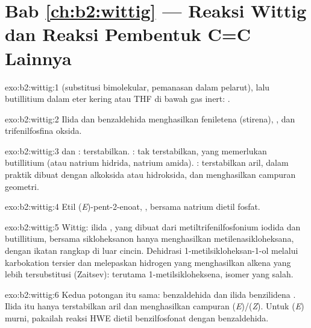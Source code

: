 \section*{Bab \ref{ch:b2:wittig} --- Reaksi Wittig dan Reaksi Pembentuk C=C Lainnya}

\begin{solution}{exo:b2:wittig:1}
 (substitusi bimolekular,
pemanasan dalam pelarut), lalu butillitium dalam eter kering atau THF di
bawah gas inert: .
\end{solution}

\begin{solution}{exo:b2:wittig:2}
Ilida  dan benzaldehida menghasilkan feniletena (stirena),
, dan trifenilfosfina oksida.
\end{solution}

\begin{solution}{exo:b2:wittig:3}
 dan : terstabilkan. : tak
terstabilkan, yang memerlukan butillitium (atau natrium hidrida, natrium
amida). : terstabilkan aril, dalam praktik dibuat dengan
alkoksida atau hidroksida, dan menghasilkan campuran geometri.
\end{solution}

\begin{solution}{exo:b2:wittig:4}
Etil (\textit{E})-pent-2-enoat, , bersama natrium dietil fosfat.
\end{solution}

\begin{solution}{exo:b2:wittig:5}
Wittig: ilida , yang dibuat dari metiltrifenilfosfonium iodida
dan butillitium, bersama sikloheksanon hanya menghasilkan
metilenasikloheksana, dengan ikatan rangkap di luar cincin. Dehidrasi
1-metilsikloheksan-1-ol melalui karbokation tersier dan melepaskan hidrogen
yang menghasilkan alkena yang lebih tersubstitusi (Zaitsev): terutama
1-metilsikloheksena, isomer yang salah.
\end{solution}

\begin{solution}{exo:b2:wittig:6}
Kedua potongan itu sama: benzaldehida dan ilida benzilidena
. Ilida itu hanya terstabilkan aril dan menghasilkan campuran
(\textit{E})/(\textit{Z}). Untuk (\textit{E}) murni, pakailah reaksi HWE
dietil benzilfosfonat dengan benzaldehida.
\end{solution}

